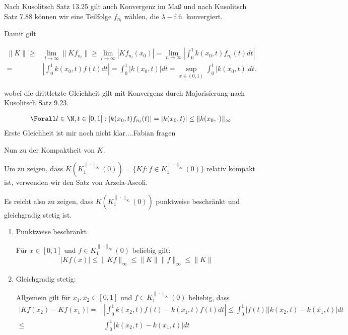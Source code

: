 \begin{solution}
Nach Kusolitsch Satz 13.25 gilt auch Konvergenz im Maß und nach Kusolitsch Satz 7.88 können wir eine Teilfolge $f_{n_l}$ wählen, die $\lambda-$f.ü. konvergiert.

Damit gilt

\begin{align*}
  \|K\| \geq& \lim_{l \to \infty} \|Kf_{n_l}\| \geq \lim_{l \to \infty} |Kf_{n_l}(x_0)| = \lim_{n \to \infty} |\int_{0}^{1} k(x_0,t)f_{n_l}(t) dt| \\
  =& |\int_{0}^{1} k(x_0,t)f(t) dt| = \int_{0}^{1} |k(x_0,t)| dt = \sup_{x \in (0,1)} \int_{0}^{1} |k(x_0,t)| dt.
\end{align*}

wobei die drittletzte Gleichheit gilt mit Konvergenz durch Majorisierung nach Kusolitsch Satz 9.23.

\begin{align*}
  \Forall l \in \N, t \in [0,1]: |k(x_0,t)f_{n_l}(t)| = |k(x_0,t)| \leq \|k(x_0,\cdot)\|_{\infty}
\end{align*}
Erste Gleichheit ist mir noch nicht klar....Fabian fragen

Nun zu der Kompaktheit von $K$.

 Um zu zeigen, dass $K(K_{1}^{\|\cdot\|_{\infty}}(0)) = \{Kf : f \in K_{1}^{\|\cdot\|_{\infty}}(0)\}$ relativ kompakt ist, verwenden wir den Satz von Arzela-Ascoli.

 Es reicht also zu zeigen, dass $K(K_{1}^{\|\cdot\|_{\infty}}(0))$ punktweise beschränkt und gleichgradig stetig ist.

 \begin{enumerate}

 \item Punktweise beschränkt

 Für $x \in [0,1]$ und $f \in K_{1}^{\|\cdot\|_{\infty}}(0)$ beliebig gilt:
\begin{align*}
  |Kf(x)| \leq \|Kf\|_{\infty} \leq \|K\| \|f\|_{\infty} \leq \|K\|
\end{align*}

\item Gleichgradig stetig:

Allgemein gilt für $x_1, x_2 \in [0,1]$ und $f \in K_{1}^{\|\cdot\|_{\infty}}(0)$ beliebig, dass
\begin{align*}
  |Kf(x_2) - Kf(x_1)| =& | \int_{0}^{1} k(x_2,t)f(t) - k(x_1,t)f(t) dt| \leq \int_{0}^{1} |f(t)||k(x_2,t)- k(x_1,t)|dt \\
  \leq& \int_{0}^{1} |k(x_2,t)- k(x_1,t)|dt
\end{align*}


\end{enumerate}
\end{solution}
